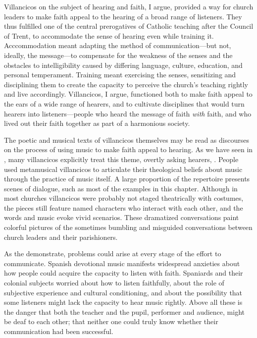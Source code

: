 Villancicos on the subject of hearing and faith, I argue, provided a way for
church leaders to make faith appeal to the hearing of a broad range of
listeners.
They thus fulfilled one of the central prerogatives of Catholic teaching after
the Council of Trent, to accommodate the sense of hearing even while training
it.
Acccommodation meant adapting the method of communication---but not, ideally,
the message---to compensate for the weakness of the senses and the obstacles to
intelligibility caused by differing language, culture, education, and personal
temperament. 
Training meant exercising the senses, sensitizing and disciplining them to
create the capacity to perceive the church's teaching rightly and live
accordingly.
Villancicos, I argue, functioned both to make faith appeal to the
ears of a wide range of hearers, and to cultivate disciplines that would turn
hearers into listeners---people who heard the message of faith \emph{with}
faith, and who lived out their faith together as part of a harmonious society.


The poetic and musical texts of villancicos themselves may be read as discourses
on the process of using music to make faith appeal to hearing.
As we have seen in , many villancicos explicitly treat this
theme, overtly asking hearers,  .
People used metamusical villancicos to articulate their theological beliefs
about music through the practice of music itself.
A large proportion of the repertoire presents scenes of dialogue, such as most
of the examples in this chapter.
Although in most churches villancicos were probably not staged theatrically with
costumes, the pieces still feature named characters who interact with each
other, and the words and music evoke vivid scenarios.
These dramatized conversations paint colorful pictures of the sometimes bumbling
and misguided conversations between church leaders and their parishioners.


As the  demonstrate, problems could arise at
every stage of the effort to communicate.
Spanish devotional music manifests widespread anxieties about how people could
acquire the capacity to listen with faith.
Spaniards and their colonial subjects worried about how to listen faithfully,
about the role of subjective experience and cultural conditioning, and about the
possibility that some listeners might lack the capacity to hear music rightly.
Above all these is the danger that both the teacher and the pupil, performer and
audience, might be deaf to each other; that neither one could truly know whether
their communication had been successful.


